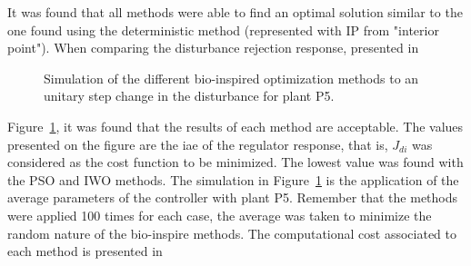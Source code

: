 It was found that all methods were able to find an optimal solution similar to the one found using the deterministic method (represented with IP from "interior point"). When comparing the disturbance rejection response, presented in %
%
\begin{figure}[tb]%
	\centering
	\caption{Simulation of the different bio-inspired optimization methods to an unitary step change in the disturbance for plant P5.}%
	\label{fig:Disturbance}%
\end{figure}
%
Figure~\ref{fig:Disturbance}, it was found that the results of each method are acceptable. The values presented on the figure are the \gls{iae} of the regulator response, that is, $J_{di}$ was considered as the cost function to be minimized. The lowest value was found with the PSO and IWO methods. The simulation in Figure~\ref{fig:Disturbance} is the application of the average parameters of the controller with plant P5. Remember that the methods were applied 100 times for each case, the average was taken to minimize the random nature of the bio-inspire methods. The computational cost associated to each method is presented in %
%
